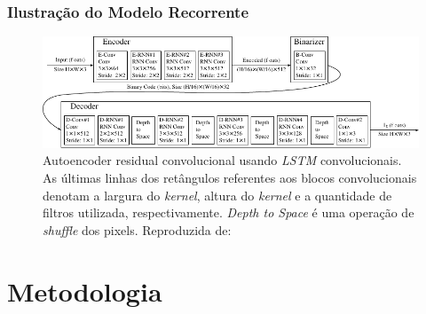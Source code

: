 \documentclass{beamer}
\begin{document}
\begin{frame}
\frametitle{Ilustração do Modelo Recorrente}
\begin{figure}
\includegraphics[width=\textwidth]{figs/toderici_4.pdf}
\caption{Autoencoder residual convolucional usando \textit{LSTM} convolucionais. As últimas linhas dos retângulos referentes aos blocos convolucionais denotam a largura do \textit{kernel}, altura do \textit{kernel} e a quantidade de filtros utilizada, respectivamente. \textit{Depth to Space} é uma operação de \textit{shuffle} dos pixels. Reproduzida de:~\cite{toderici2017}}
\label{fig:rec_conv_ae}
\end{figure}
\end{frame}
\section{Metodologia}
\end{document}
